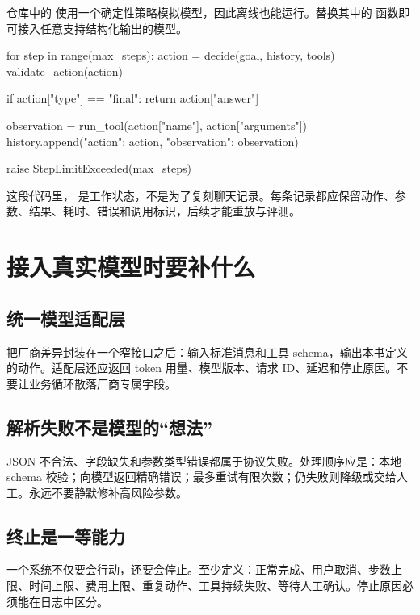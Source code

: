 仓库中的  使用一个确定性策略模拟模型，因此离线也能运行。替换其中的  函数即可接入任意支持结构化输出的模型。

\begin{codeblock}
for step in range(max_steps):
    action = decide(goal, history, tools)
    validate_action(action)

    if action["type"] == "final":
        return action["answer"]

    observation = run_tool(action["name"], action["arguments"])
    history.append({"action": action, "observation": observation})

raise StepLimitExceeded(max_steps)
\end{codeblock}

这段代码里， 是工作状态，不是为了复刻聊天记录。每条记录都应保留动作、参数、结果、耗时、错误和调用标识，后续才能重放与评测。

\section{接入真实模型时要补什么}

\subsection{统一模型适配层}

把厂商差异封装在一个窄接口之后：输入标准消息和工具 schema，输出本书定义的动作。适配层还应返回 token 用量、模型版本、请求 ID、延迟和停止原因。不要让业务循环散落厂商专属字段。

\subsection{解析失败不是模型的“想法”}

JSON 不合法、字段缺失和参数类型错误都属于协议失败。处理顺序应是：本地 schema 校验；向模型返回精确错误；最多重试有限次数；仍失败则降级或交给人工。永远不要静默修补高风险参数。

\subsection{终止是一等能力}

一个系统不仅要会行动，还要会停止。至少定义：正常完成、用户取消、步数上限、时间上限、费用上限、重复动作、工具持续失败、等待人工确认。停止原因必须能在日志中区分。

